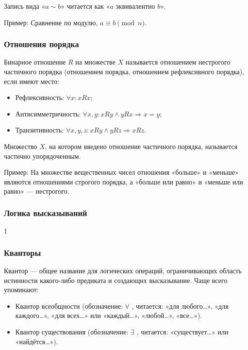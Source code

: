 \documentclass[12pt]{matmex-diploma}
\begin{document}
            Запись вида «$a\sim b$» читается как «$a$ эквивалентно $b$».
            
            Пример: Сравнение по модулю, $a \equiv b \pmod n$.
            
        \subsubsection*{Отношения порядка}
            Бинарное отношение $R$ на множестве $X$ называется отношением нестрогого частичного порядка (отношением порядка, отношением рефлексивного порядка), если имеют место:
            \begin{itemize}
                \item Рефлексивность: $\forall x: xRx$;
                \item Антисимметричность: $\forall x, y: x R y \land y R x \Rightarrow x = y$;
                \item Транзитивность: $\forall x,y,z: x R y \land y R z \Rightarrow x R z$.
            \end{itemize}

            Множество $X$, на котором введено отношение частичного порядка, называется частично упорядоченным.
            
            Пример: На множестве вещественных чисел отношения «больше» и «меньше» являются отношениями строгого порядка, а «больше или равно» и «меньше или равно» — нестрогого.
            
        \subsubsection*{Логика высказываний}
            1
        \subsubsection*{Кванторы}
            Квантор — общее название для логических операций, ограничивающих область истинности какого-либо предиката и создающих высказывание. Чаще всего упоминают:
            \begin{itemize}
                \item Квантор всеобщности (обозначение: $\forall$ , читается: «для любого…», «для каждого…», «для всех…» или «каждый…», «любой…», «все…»).
                \item Квантор существования (обозначение: $\exists$ , читается: «существует…» или «найдётся…»).
            \end{itemize}
            
\end{document}
